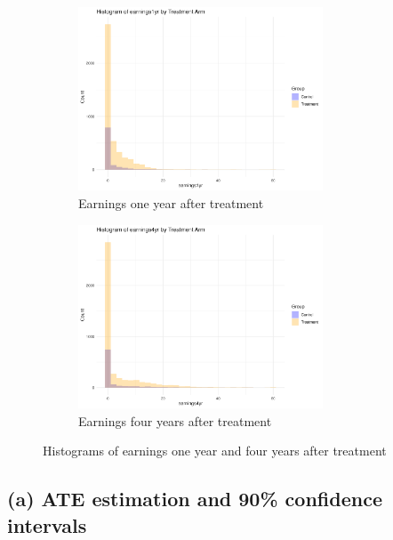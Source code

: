 \documentclass[11pt]{article}
\numberwithin{equation}{section}
\begin{document}
\begin{figure}[h]
    \centering
    \begin{subfigure}{0.48\textwidth}
        \includegraphics[width=0.8\textwidth]{output/histogram_earnings1yr_by_treatment_arm.png}
        \caption{\label{fig:hist_earnings1yr}Earnings one year after treatment}
    \end{subfigure}
    \begin{subfigure}{0.48\textwidth}
        \includegraphics[width=0.8\textwidth]{output/histogram_earnings4yr_by_treatment_arm.png}
        \caption{\label{fig:hist_earnings4yr}Earnings four years after treatment}
    \end{subfigure}
    \caption{\label{fig:hist_earnings}Histograms of earnings one year and four years after treatment}
\end{figure}



\subsection*{(a) ATE estimation and 90\% confidence intervals}
\end{document}
